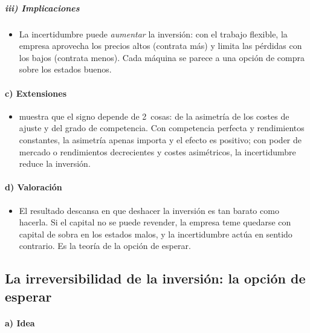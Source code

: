 \documentclass[11pt]{article}
\begin{document}
\subparagraph{iii) Implicaciones}

\begin{itemize}
\item La incertidumbre puede \emph{aumentar} la inversión: con el trabajo flexible, la empresa aprovecha los precios altos (contrata más) y limita las pérdidas con los bajos (contrata menos). Cada máquina se parece a una opción de compra sobre los estados buenos.
\end{itemize}

\paragraph{c) Extensiones}

\begin{itemize}
\item \textcite{Caballero1991Sign} muestra que el signo depende de 2~cosas: de la asimetría de los costes de ajuste y del grado de competencia. Con competencia perfecta y rendimientos constantes, la asimetría apenas importa y el efecto es positivo; con poder de mercado o rendimientos decrecientes y costes asimétricos, la incertidumbre reduce la inversión.
\end{itemize}

\paragraph{d) Valoración}

\begin{itemize}
\item El resultado descansa en que deshacer la inversión es tan barato como hacerla. Si el capital no se puede revender, la empresa teme quedarse con capital de sobra en los estados malos, y la incertidumbre actúa en sentido contrario. Es la teoría de la opción de esperar.
\end{itemize}

\subsection{La irreversibilidad de la inversión: la opción de esperar}\label{sec:irreversibilidad}

\paragraph{a) Idea}
\end{document}
